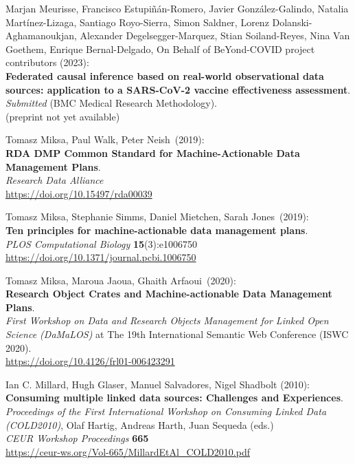 \begin{thebibliography}{9}
Marjan Meurisse, Francisco Estupiñán-Romero, Javier González-Galindo, Natalia Martínez-Lizaga, Santiago Royo-Sierra, Simon Saldner, Lorenz Dolanski-Aghamanoukjan, Alexander Degelsegger-Marquez, Stian Soiland-Reyes, Nina Van Goethem, Enrique Bernal-Delgado, On Behalf of BeYond-COVID project contributors (2023):\\
\textbf{Federated causal inference based on real-world observational data sources: application to a SARS-CoV-2 vaccine effectiveness assessment}.  \\
\emph{Submitted} (BMC Medical Research Methodology).\\
(preprint not yet available)

Tomasz Miksa, Paul Walk, Peter Neish~(2019):\\
\textbf{RDA DMP Common Standard for Machine-Actionable Data Management
Plans}.\\
\emph{Research Data Alliance}\\
\url{https://doi.org/10.15497/rda00039}

Tomasz Miksa, Stephanie Simms, Daniel Mietchen, Sarah Jones~(2019):\\
\textbf{Ten principles for machine-actionable data management plans}.\\
\emph{PLOS Computational Biology} \textbf{15}(3):e1006750\\
\url{https://doi.org/10.1371/journal.pcbi.1006750}

Tomasz Miksa, Maroua Jaoua, Ghaith Arfaoui~(2020):\\
\textbf{Research Object Crates and Machine-actionable Data Management
Plans}.\\
\emph{First Workshop on Data and Research Objects Management for Linked
Open Science (DaMaLOS)} at The 19th International Semantic Web
Conference (ISWC 2020).\\
\url{https://doi.org/10.4126/frl01-006423291}

Ian C. Millard, Hugh Glaser, Manuel Salvadores, Nigel Shadbolt (2010):\\
\textbf{Consuming multiple linked data sources: Challenges and Experiences}.\\
\emph{Proceedings of the First International Workshop on Consuming Linked Data (COLD2010)}, 
Olaf Hartig, Andreas Harth, Juan Sequeda (eds.) \\
\emph{CEUR Workshop Proceedings} \textbf{665}\\
\url{https://ceur-ws.org/Vol-665/MillardEtAl_COLD2010.pdf}


\end{thebibliography}
